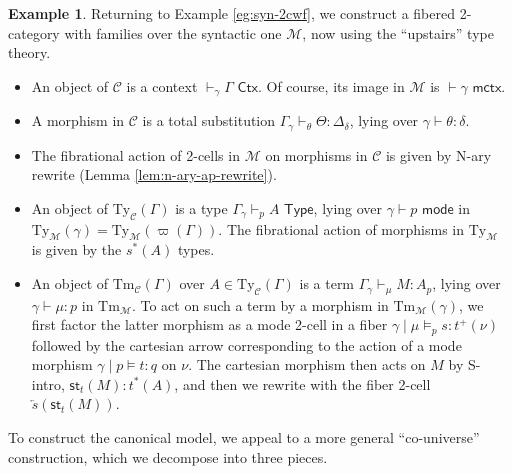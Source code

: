 \documentclass[10pt]{article}
\theoremstyle{definition}
\newtheorem{example}{Example}
\newcommand{\yields}{\vdash}
\newcommand{\CTX}{\,\,\mathsf{Ctx}}
\newcommand{\ctx}{\,\,\mathsf{mctx}}
\newcommand{\TYPE}{\,\,\mathsf{Type}}
\newcommand{\type}{\,\,\mathsf{mode}}
\newcommand{\rewrite}[2]{\overleftarrow{#1}(#2)}
\newcommand\St[2]{\ensuremath{{#1}^*(#2)}}
\newcommand\StI[2]{\ensuremath{\mathsf{st}_{#1}(#2)}}
\newcommand\TypeTwo[4]{\ensuremath{#1 \mid #3 \vDash #2 : #4}}
\newcommand\TermTwoT[5]{\ensuremath{#1 \mid #3 \vDash_{#5} {#2} : #4}}
\newcommand\TrPlus[2]{\ensuremath{{#1}^+(#2)}}
\newcommand\M{\mathcal{M}}
\newcommand\Mty{{\mathrm{Ty}_{\M}}}
\newcommand\Mtm{{\mathrm{Tm}_{\M}}}
\newcommand\C{\mathcal{C}}
\newcommand\Cty{\mathrm{Ty}_{\C}}
\newcommand\Ctm{\mathrm{Tm}_{\C}}
\newcommand\vp{\varpi}
\begin{document}
\begin{example}\label{eg:syn-fib-2cwf}
  Returning to Example \ref{eg:syn-2cwf}, we construct a fibered 2-category with families over the syntactic one $\M$, now using the ``upstairs'' type theory.
  \begin{itemize}
  \item An object of $\C$ is a context $\yields_\gamma \Gamma \CTX$.
    Of course, its image in $\M$ is $\yields \gamma \ctx$.
  \item A morphism in $\C$ is a total substitution $\Gamma_{\gamma} \yields_\theta \Theta : \Delta_\delta$, lying over $\gamma \yields \theta : \delta$.
  \item The fibrational action of 2-cells in $\M$ on morphisms in $\C$ is given by N-ary rewrite (Lemma \ref{lem:n-ary-ap-rewrite}).
  \item An object of $\Cty(\Gamma)$ is a type $\Gamma_\gamma \yields_p A \TYPE$, lying over $\gamma \yields p\type$ in $\Mty(\gamma) = \Mty(\vp(\Gamma))$.
    The fibrational action of morphisms in $\Mty$ is given by the $\St{s}{A}$ types.
  \item An object of $\Ctm(\Gamma)$ over $A\in \Cty(\Gamma)$ is a term $\Gamma_\gamma \yields_\mu M:A_p$, lying over $\gamma \yields \mu:p$ in $\Mtm$.
    To act on such a term by a morphism in $\Mtm(\gamma)$, we first factor the latter morphism as a mode 2-cell in a fiber $\TermTwoT{\gamma}{s}{\mu}{\TrPlus{t}{\nu}}{p}$ followed by the cartesian arrow corresponding to the action of a mode morphism $\TypeTwo{\gamma}{t}{p}{q}$ on $\nu$.
    The cartesian morphism then acts on $M$ by S-intro, $\StI{t}{M} : \St{t}{A}$, and then we rewrite with the fiber 2-cell $\rewrite{s}{\StI{t}{M}}$.
  \end{itemize}
\end{example}

To construct the canonical model, we appeal to a more general ``co-universe'' construction, which we decompose into three pieces.
\end{document}

